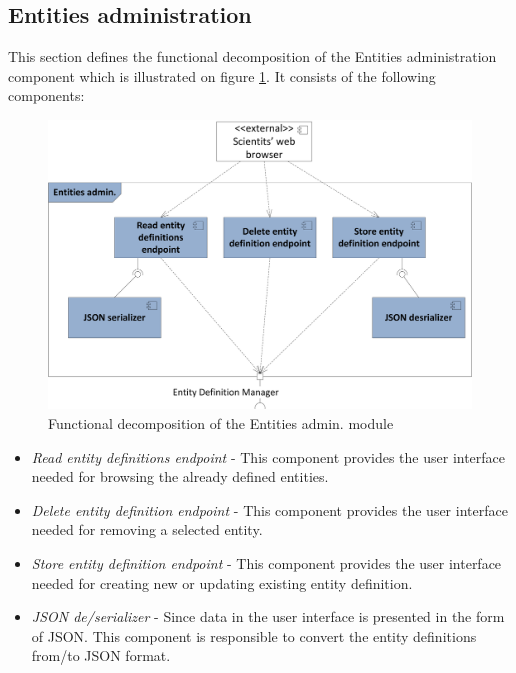 \subsection{Entities administration}
This section defines the functional decomposition of the Entities administration component which is illustrated on figure \ref{fig:storageFuncAdmin}. It consists of the following components:

\begin{figure}[h!]
  \centering
  	\includegraphics[scale=0.6]{storage/functional/func_admin.png}
  \caption{Functional decomposition of the Entities admin. module}
  \label{fig:storageFuncAdmin}
\end{figure}

\begin{itemize}
	\item \textit{Read entity definitions endpoint} - This component provides the user interface needed for browsing the already defined entities.
	
	\item \textit{Delete entity definition endpoint} - This component provides the user interface needed for removing a selected entity.
	 
	\item \textit{Store entity definition endpoint} - This component provides the user interface needed for creating new or updating existing entity definition.
	
	\item \textit{JSON de/serializer} - Since data in the user interface is presented in the form of JSON. This component is responsible to convert the entity definitions from/to JSON format.
	
\end{itemize}

